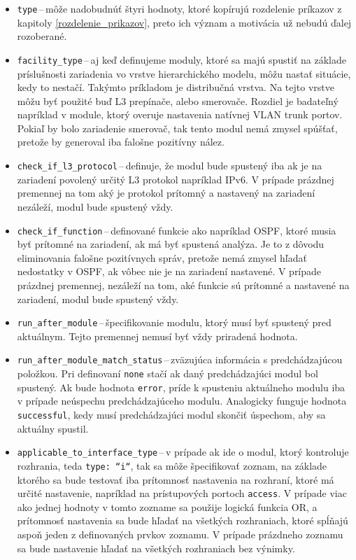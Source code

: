 \begin{itemize}
	\item \texttt{type}\,--\,môže nadobudnúť štyri hodnoty, ktoré kopírujú rozdelenie príkazov z kapitoly \ref{rozdelenie_prikazov}, preto ich význam a motivácia už nebudú ďalej rozoberané.
	\item \texttt{facility\_type}\,--\,aj keď definujeme moduly, ktoré sa majú spustiť na základe príslušnosti zariadenia vo vrstve hierarchického modelu, môžu nastať situácie, kedy to nestačí. Takýmto príkladom je distribučná vrstva. Na tejto vrstve môžu byť použité buď L3 prepínače, alebo smerovače. Rozdiel je badateľný napríklad v module, ktorý overuje nastavenia natívnej VLAN trunk portov. Pokiaľ by bolo zariadenie smerovač, tak tento modul nemá zmysel spúšťať, pretože by generoval iba falošne pozitívny nález.
	\item \texttt{check\_if\_l3\_protocol}\,--\,definuje, že modul bude spustený iba ak je na zariadení povolený určitý L3 protokol napríklad IPv6. V prípade prázdnej premennej na tom aký je protokol prítomný a nastavený na zariadení nezáleží, modul bude spustený vždy.
	\item \texttt{check\_if\_function}\,--\,definované funkcie ako napríklad OSPF, ktoré musia byť prítomné na zariadení, ak má byť spustená analýza. Je to z dôvodu eliminovania falošne pozitívnych správ, pretože nemá zmysel hľadať nedostatky v OSPF, ak vôbec nie je na zariadení nastavené. V prípade prázdnej premennej, nezáleží na tom, aké funkcie sú prítomné a nastavené na zariadení, modul bude spustený vždy.
	\item \texttt{run\_after\_module}\,--\,špecifikovanie modulu, ktorý musí byť spustený pred aktuálnym. Tejto premennej nemusí byť vždy priradená hodnota.
	\item \texttt{run\_after\_module\_match\_status}\,--\,zväzujúca informácia s predchádzajúcou položkou. Pri definovaní \texttt{none} stačí ak daný predchádzajúci modul bol spustený. Ak bude hodnota \texttt{error}, príde k spusteniu aktuálneho modulu iba v prípade neúspechu predchádzajúceho modulu. Analogicky funguje hodnota \texttt{successful}, kedy musí predchádzajúci modul skončiť úspechom, aby sa aktuálny spustil.
	\item \texttt{applicable\_to\_interface\_type}\,--\,v prípade ak ide o modul, ktorý kontroluje rozhrania, teda \texttt{type: ``i``}, tak sa môže špecifikovať zoznam, na základe ktorého sa bude testovať iba prítomnosť nastavenia na rozhraní, ktoré má určité nastavenie, napríklad na prístupových portoch \texttt{access}. V prípade viac ako jednej hodnoty v tomto zozname sa použije logická funkcia OR, a prítomnosť nastavenia sa bude hľadať na všetkých rozhraniach, ktoré spĺňajú aspoň jeden z definovaných prvkov zoznamu. V prípade prázdneho zoznamu sa bude nastavenie hľadať na všetkých rozhraniach bez výnimky.

\end{itemize}
